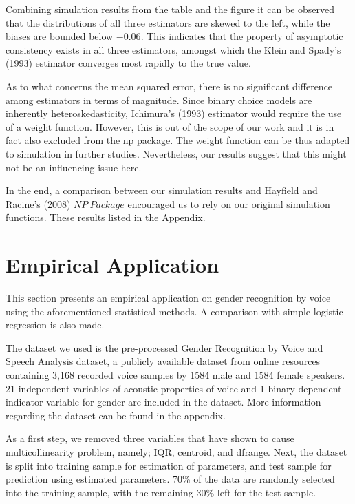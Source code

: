 \documentclass[a4paper]{article}
\begin{document}
Combining simulation results from the table and the figure it can be observed that the distributions of all three estimators are skewed to the left, while the biases are bounded below $-0.06$. This indicates that the property of asymptotic consistency exists in all three estimators, amongst which the Klein and Spady's (1993) \cite{[12]} estimator converges most rapidly to the true value. 

As to what concerns the mean squared error, there is no significant difference among estimators in terms of magnitude. Since binary choice models are inherently heteroskedasticity, Ichimura’s (1993) \cite{[6]}  estimator would require the use of a weight function. However, this is out of the scope of our work and it is in fact also excluded from the np package. The weight function can be thus adapted to simulation in further studies. Nevertheless, our results suggest that this might not be an influencing issue here. 

In the end, a comparison between our simulation results and Hayfield and Racine's (2008) \cite{[28]} $NP\ Package$ encouraged us to rely on our original simulation functions. These results listed in the Appendix.

\section{Empirical Application} %
\label{sec:Empirical Application}

This section presents an empirical application on gender recognition by voice using the aforementioned statistical methods. A comparison with simple logistic regression is also made. 

The dataset we used is the pre-processed Gender Recognition by Voice and Speech Analysis dataset, a publicly available dataset from online resources containing 3,168 recorded voice samples by 1584 male and 1584 female speakers. 21 independent variables of acoustic properties of voice and 1 binary dependent indicator variable for gender are included in the dataset. More information regarding the dataset can be found in the appendix.  

As a first step, we removed three variables that have shown to cause multicollinearity problem,  namely; IQR, centroid, and dfrange. Next, the dataset is split into training sample for estimation of parameters, and test sample for prediction using estimated parameters. 70\% of the data are randomly selected into the training sample, with the remaining 30\% left for the test sample. 
\end{document}

